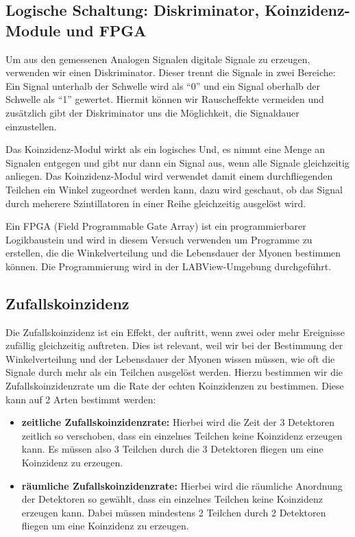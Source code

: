 \documentclass{article}
\begin{document}
\subsection{Logische Schaltung: Diskriminator, Koinzidenz-Module und FPGA}
Um aus den gemessenen Analogen Signalen digitale Signale zu erzeugen, verwenden wir einen Diskriminator. 
Dieser trennt die Signale in zwei Bereiche: Ein Signal unterhalb der Schwelle wird als \enquote{0} und ein Signal oberhalb der Schwelle als \enquote{1} gewertet. 
Hiermit können wir Rauscheffekte vermeiden und zusätzlich gibt der Diskriminator uns die Möglichkeit, die Signaldauer einzustellen.

Das Koinzidenz-Modul wirkt als ein logisches Und, es nimmt eine Menge an Signalen entgegen und gibt nur dann ein Signal aus, 
wenn alle Signale gleichzeitig anliegen. Das Koinzidenz-Modul wird verwendet damit einem durchfliegenden Teilchen ein Winkel zugeordnet werden kann, 
dazu wird geschaut, ob das Signal durch meherere Szintillatoren in einer Reihe gleichzeitig ausgelöst wird.

Ein FPGA (Field Programmable Gate Array) ist ein programmierbarer Logikbaustein und wird in diesem Versuch verwenden um Programme zu erstellen, die die Winkelverteilung
und die Lebensdauer der Myonen bestimmen können.
Die Programmierung wird in der LABView-Umgebung durchgeführt.
\subsection{Zufallskoinzidenz} 
Die Zufallskoinzidenz ist ein Effekt, der auftritt, wenn zwei oder mehr Ereignisse zufällig gleichzeitig auftreten. 
Dies ist relevant, weil wir bei der Bestimmung der Winkelverteilung und der Lebensdauer der Myonen wissen müssen, wie oft die Signale durch mehr als ein Teilchen
ausgelöst werden. Hierzu bestimmen wir die Zufallskoinzidenzrate um die Rate der echten Koinzidenzen zu bestimmen.
Diese kann auf 2 Arten bestimmt werden:
\begin{itemize}
    \item \textbf{zeitliche Zufallskoinzidenzrate:} Hierbei wird die Zeit der 3 Detektoren zeitlich so verschoben, dass ein einzelnes Teilchen keine Koinzidenz erzeugen kann.
        Es müssen also 3 Teilchen durch die 3 Detektoren fliegen um eine Koinzidenz zu erzeugen.
    \item \textbf{räumliche Zufallskoinzidenzrate:} Hierbei wird die räumliche Anordnung der Detektoren so gewählt, dass ein einzelnes Teilchen keine Koinzidenz erzeugen kann.
        Dabei müssen mindestens 2 Teilchen durch 2 Detektoren fliegen um eine Koinzidenz zu erzeugen.
\end{itemize}   
\end{document}
